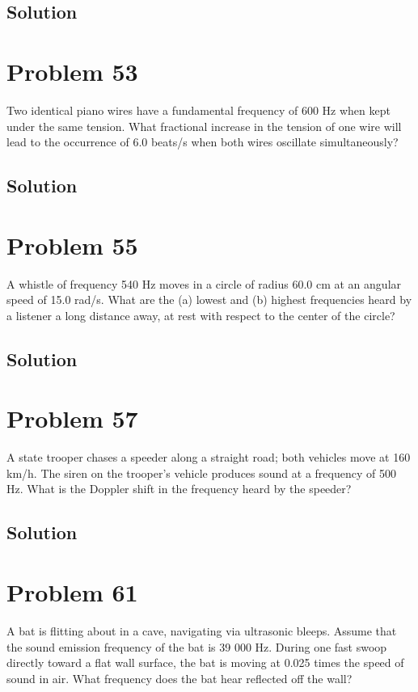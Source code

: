 \documentclass[12pt]{article}
\begin{document}
        \subsection{Solution}

    \pagebreak
    \section{Problem 53}
        Two identical piano wires have a fundamental frequency of 600 Hz when kept under the same tension. 
        What fractional increase in the tension of one wire will lead to the occurrence of 6.0 beats/s when both wires oscillate simultaneously?

        \subsection{Solution}

    \pagebreak
    \section{Problem 55}
        A whistle of frequency 540 Hz moves in a circle of radius 60.0 cm at an angular speed of 15.0 rad/s. 
        What are the (a) lowest and (b) highest frequencies heard by a listener a long distance away, at rest with respect to the center of the circle?

        \subsection{Solution}

    \pagebreak
    \section{Problem 57}
        A state trooper chases a speeder along a straight road; both vehicles move at 160 km/h. 
        The siren on the trooper's vehicle produces sound at a frequency of 500 Hz. 
        What is the Doppler shift in the frequency heard by the speeder?

        \subsection{Solution}

    \pagebreak
    \section{Problem 61}
        A bat is flitting about in a cave, navigating via ultrasonic bleeps. 
        Assume that the sound emission frequency of the bat is 39 000 Hz. 
        During one fast swoop directly toward a flat wall surface, the bat is moving at 0.025 times the speed of sound in air. 
        What frequency does the bat hear reflected off the wall?
\end{document}
